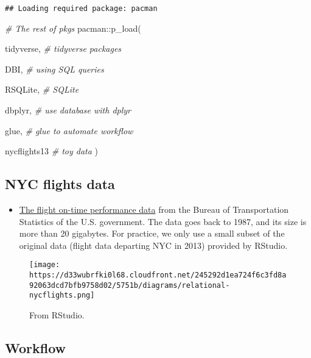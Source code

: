 \documentclass[
]{book}
\newenvironment{Shaded}{\begin{snugshade}}{\end{snugshade}}
\newcommand{\CommentTok}[1]{\textcolor[rgb]{0.56,0.35,0.01}{\textit{#1}}}
\newcommand{\FunctionTok}[1]{\textcolor[rgb]{0.00,0.00,0.00}{#1}}
\newcommand{\NormalTok}[1]{#1}
\newcommand{\SpecialCharTok}[1]{\textcolor[rgb]{0.00,0.00,0.00}{#1}}
\providecommand{\tightlist}{%
  \setlength{\itemsep}{0pt}\setlength{\parskip}{0pt}}
\begin{document}
\begin{verbatim}
## Loading required package: pacman
\end{verbatim}

\begin{Shaded}
\begin{Highlighting}[]
\CommentTok{\# The rest of pkgs }
\NormalTok{pacman}\SpecialCharTok{::}\FunctionTok{p\_load}\NormalTok{(}
 
\NormalTok{ tidyverse, }\CommentTok{\# tidyverse packages }
 
\NormalTok{ DBI, }\CommentTok{\# using SQL queries}
 
\NormalTok{ RSQLite, }\CommentTok{\# SQLite}
 
\NormalTok{ dbplyr, }\CommentTok{\# use database with dplyr }
 
\NormalTok{ glue, }\CommentTok{\# glue to automate workflow }
 
\NormalTok{ nycflights13 }\CommentTok{\# toy data }
\NormalTok{)}
\end{Highlighting}
\end{Shaded}

\hypertarget{nyc-flights-data}{%
\subsection{NYC flights data}\label{nyc-flights-data}}

\begin{itemize}
\tightlist
\item
  \href{https://www.transtats.bts.gov/DL_SelectFields.asp?Table_ID=236}{The flight on-time performance data} from the Bureau of Transportation Statistics of the U.S. government. The data goes back to 1987, and its size is more than 20 gigabytes. For practice, we only use a small subset of the original data (flight data departing NYC in 2013) provided by RStudio.
\end{itemize}

\begin{figure}
\centering
\texttt{[image: https://d33wubrfki0l68.cloudfront.net/245292d1ea724f6c3fd8a92063dcd7bfb9758d02/5751b/diagrams/relational-nycflights.png]}
\caption{From RStudio.}
\end{figure}

\hypertarget{workflow-4}{%
\subsection{Workflow}\label{workflow-4}}
\end{document}

